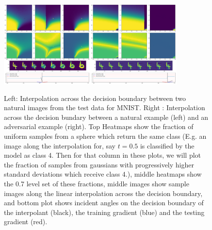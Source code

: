 \begin{figure}[ht!]
    \centering
    \includegraphics[width=0.42\textwidth]{c5_figures/stab-mnist-C32-50-50-10-0.001-eval-1e-06-none-4-6-db_interp-stability-50.png}\includegraphics[width=0.42\textwidth]{c5_figures/stab-mnist-C32-50-50-10-0.001-eval-1e-06-pgd-4-6-db_interp-stability-50.png}

    \caption{Left: Interpolation across the decision boundary between
      two natural images from the test data for MNIST. Right :
      Interpolation across the decision bundary between a natural
      example (left) and an adversarial example (right). Top Heatmaps
      show the fraction of uniform samples from a sphere which return
      the same class (E.g. an image along the interpolation for, say $t = 0.5$ is classified by the model as class 4. Then for that column in these plots, we will plot the fraction of samples from gaussians with progressively higher standard deviations which receive class 4.), middle  heatmaps show the 0.7 level set of these
      fractions, middle images show sample images along the linear interpolation across the decision boundary, and bottom plot shows incident angles on the decision
      boundary of the interpolant (black), the training gradient
      (blue) and the testing gradient (red). }
    \label{fig:dbs}
\end{figure}


